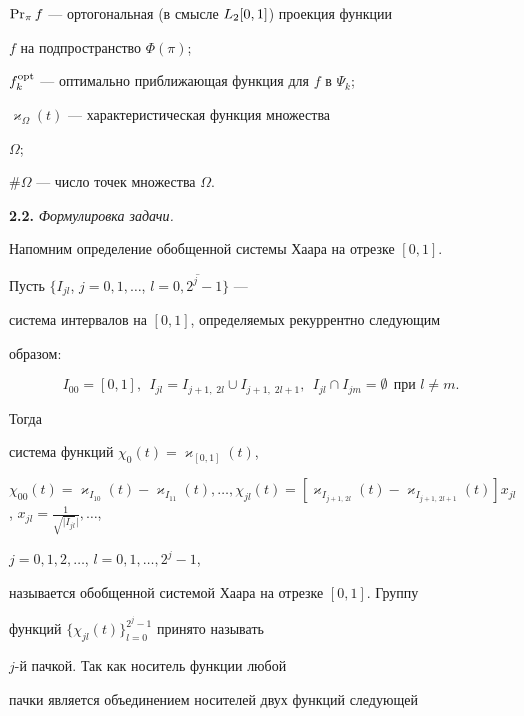 $\operatorname{Pr}_{\pi}f$ --- ортогональная (в смысле $L_2[0,1]$) проекция функции


$f$ на подпространство $\Phi(\pi)$;





$f_k^{\operatorname{opt}}$ --- оптимально приближающая функция для $f$ в $\Psi_k$;





$\varkappa_{\Omega}(t)$ --- характеристическая функция множества


$\Omega$;





$\# \Omega$ --- число точек множества $\Omega$.


\medskip





{\bf 2.2.} {\it Формулировка задачи.}


Напомним определение обобщенной системы Хаара на отрезке $[0,1]$.





Пусть $\{I_{jl}$, $j=0,1,\dotsc$, $l=\overline{0,2^j-1}\}$ ---


система интервалов на $[0,1]$, определяемых рекуррентно следующим


образом:


$$


I_{00}=[0,1],\ \ I_{jl}=I_{j+1,\; 2l}\cup I_{j+1,\;


2l+1},\ \  I_{jl} \cap I_{jm}=\emptyset\ \ \text{при $l\neq m$}.


$$


Тогда


система функций $\chi_0(t)=\varkappa_{[0,1]}(t)$,


$\chi_{00}(t)=\varkappa_{I_{10}}(t)-\varkappa_{I_{11}}(t),\dotsc,


\chi_{jl}(t)=[\varkappa_{I_{j+1,\,2l}}(t)-\varkappa_{I_{j+1,\,2l+1}}(t)]


x_{jl}$, $x_{jl}=\frac{1}{\sqrt{|I_{jl}}|},\dotsc$,


$j=0,1,2,\dotsc$, $l=0,1,\dotsc,2^{j}-1$,


называется обобщенной системой Хаара на отрезке $[0,1]$. Группу


функций $\{\chi_{jl}(t)\}_{l=0}^{2^{j}-1}$ принято называть


$j$-й пачкой. Так как носитель функции любой


пачки является объединением носителей двух функций следующей


